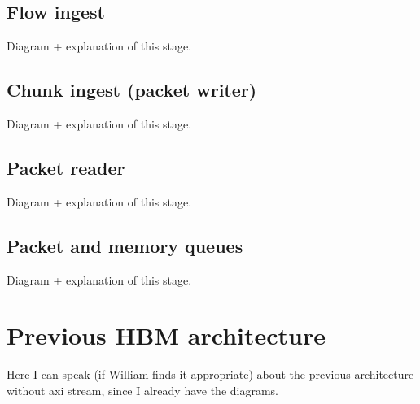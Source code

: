 \subsection{Flow ingest}
Diagram + explanation of this stage.

\subsection{Chunk ingest (packet writer)}
Diagram + explanation of this stage.

\subsection{Packet reader}
Diagram + explanation of this stage.

\subsection{Packet and memory queues}
Diagram + explanation of this stage.

\section{Previous HBM architecture}
Here I can speak (if William finds it appropriate) about the previous architecture without axi stream, since I already have the diagrams.

